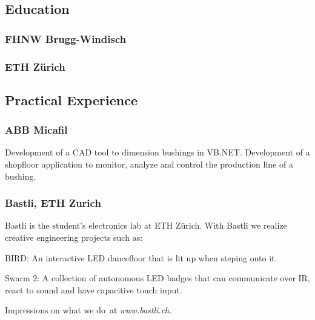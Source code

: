     \begin{timeline}
    
    
    \subsection{Education}
    
    \subsubsection{FHNW Brugg-Windisch}
    \sectionsep
    
    \subsubsection{ETH Zürich}
    \sectionsep
    
    
    \subsection{Practical Experience}
    
    \subsubsection{ABB Micafil}
    Development of a CAD tool to dimension bushings in VB.NET.
    Development of a shopfloor application to monitor, analyze and control the production line of a bushing.
    \sectionsep
    
    \subsubsection{Bastli, ETH Zurich}
    Bastli is the student's electronics lab at ETH Zürich.
    With Bastli we realize creative engineering projects such as:
    \vspace{\topsep} %
    \begin{tightemize}
    \item BIRD: An interactive LED dancefloor that is lit up when steping onto it. 
    \item Swarm 2: A collection of autonomous LED badges that can communicate over IR, react to sound and have capacitive touch input.
    \end{tightemize}
    Impressions on what we do at \textit{www.bastli.ch}.
    \sectionsep
    

\end{timeline}
